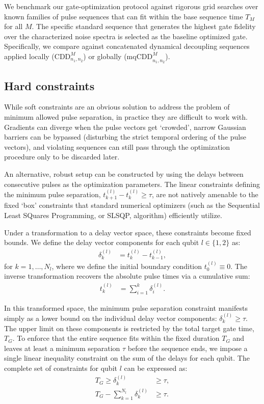 \documentclass[%
 reprint,
superscriptaddress,
 amsmath,amssymb,
 aps,
pra,
floatfix,
]{revtex4-2}
\begin{document}
We benchmark our gate-optimization protocol against rigorous grid searches over known families of pulse sequences that can fit within the base sequence time $T_M$ for all $M$. The specific standard sequence that generates the highest gate fidelity over the characterized noise spectra is selected as the baseline optimized gate. Specifically, we compare against concatenated dynamical decoupling sequences applied locally ($\text{CDD}_{n_1,n_2}^M$) or globally ($\text{mqCDD}_{n_1,n_2}^M$).

\subsection{Hard constraints}
While soft constraints are an obvious solution to address the problem of minimum allowed pulse separation, in practice they are difficult to work with. Gradients can diverge when the pulse vectors get `crowded', narrow Gaussian barriers can be bypassed (disturbing the strict temporal ordering of the pulse vectors), and violating sequences can still pass through the optimization procedure only to be discarded later.

An alternative, robust setup can be constructed by using the delays between consecutive pulses as the optimization parameters. The linear constraints defining the minimum pulse separation, $t_{k+1}^{(l)} - t_k^{(l)} \geq \tau$, are not natively amenable to the fixed `box' constraints that standard numerical optimizers (such as the Sequential Least SQuares Programming, or SLSQP, algorithm) efficiently utilize.

Under a transformation to a delay vector space, these constraints become fixed bounds. We define the delay vector components for each qubit $l \in \{1, 2\}$ as:
\begin{align}
    \delta_k^{(l)} &= t_k^{(l)} - t_{k-1}^{(l)},
\end{align}
for $k=1, \dots, N_l$, where we define the initial boundary condition $t_0^{(l)} \equiv 0$. The inverse transformation recovers the absolute pulse times via a cumulative sum:
\begin{align}
    t_k^{(l)} &= \sum_{i=1}^k \delta_i^{(l)}.
\end{align}

In this transformed space, the minimum pulse separation constraint manifests simply as a lower bound on the individual delay vector components: $\delta_k^{(l)} \geq \tau$. The upper limit on these components is restricted by the total target gate time, $T_G$. To enforce that the entire sequence fits within the fixed duration $T_G$ and leaves at least a minimum separation $\tau$ before the sequence ends, we impose a single linear inequality constraint on the sum of the delays for each qubit. The complete set of constraints for qubit $l$ can be expressed as:
\begin{align}
    T_G \geq \delta_k^{(l)} &\geq \tau, \\
    T_G - \sum_{k=1}^{N_l} \delta_k^{(l)} &\geq \tau.
\end{align}
\end{document}
